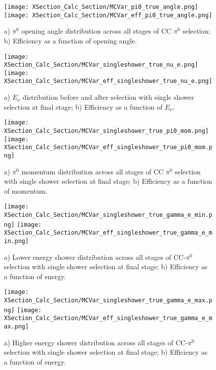 \begin{figure}[h!]
\texttt{[image: XSection\_Calc\_Section/MCVar\_pi0\_true\_angle.png]}
\hspace{3 mm}
\texttt{[image: XSection\_Calc\_Section/MCVar\_eff\_pi0\_true\_angle.png]}
\caption{a) $\pi^0$ opening angle distribution across all stages of CC $\pi^0$ selection; b) Efficiency as a function of opening angle. }
\label{fig:pi0_effs_6}
\end{figure}



\begin{figure}[h!]
\centering
\texttt{[image: XSection\_Calc\_Section/MCVar\_singleshower\_true\_nu\_e.png]}
\hspace{1 mm}
\texttt{[image: XSection\_Calc\_Section/MCVar\_eff\_singleshower\_true\_nu\_e.png]}
\caption{a) $E_\nu$ distribution before and after selection with single shower selection at final stage; b) Efficiency as a function of $E_\nu$. }
\label{fig:pi0_effs_7}
\end{figure}

\begin{figure}[h!]
\centering
\texttt{[image: XSection\_Calc\_Section/MCVar\_singleshower\_true\_pi0\_mom.png]}
\hspace{1 mm}
\texttt{[image: XSection\_Calc\_Section/MCVar\_eff\_singleshower\_true\_pi0\_mom.png]}
\caption{a) $\pi^0$ momentum distribution across all stages of CC $\pi^0$ selection with single shower selection at final stage; b) Efficiency as a function of momentum. }
\label{fig:pi0_effs_8}
\end{figure}

\begin{figure}[h!]
\centering
\texttt{[image: XSection\_Calc\_Section/MCVar\_singleshower\_true\_gamma\_e\_min.png]}
\hspace{1 mm}
\texttt{[image: XSection\_Calc\_Section/MCVar\_eff\_singleshower\_true\_gamma\_e\_min.png]}
\caption{a) Lower energy shower distribution across all stages of CC-$\pi^0$ selection with single shower selection at final stage; b) Efficiency as a function of energy. }
\label{fig:pi0_effs_9}
\end{figure}

\begin{figure}[h!]
\centering
\texttt{[image: XSection\_Calc\_Section/MCVar\_singleshower\_true\_gamma\_e\_max.png]}
\hspace{1 mm}
\texttt{[image: XSection\_Calc\_Section/MCVar\_eff\_singleshower\_true\_gamma\_e\_max.png]}
\caption{a) Higher energy shower distribution across all stages of CC-$\pi^0$ selection with single shower selection at final stage; b) Efficiency as a function of energy. }
\label{fig:pi0_effs_10}
\end{figure}

